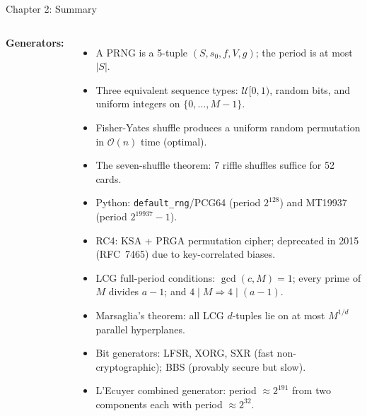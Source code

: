 \documentclass[aspectratio=169,10pt]{beamer}
\begin{document}
\begin{frame}{Chapter 2: Summary}

\begin{columns}
\textbf{Generators:}
\begin{itemize}
  \item A PRNG is a 5-tuple $(S, s_0, f, V, g)$; the period is at most $|S|$.
  \item Three equivalent sequence types: $\mathcal{U}[0,1)$, random bits,
    and uniform integers on $\{0,\ldots,M-1\}$.
  \item Fisher-Yates shuffle produces a uniform random permutation in
    $\mathcal{O}(n)$ time (optimal).
  \item The seven-shuffle theorem: 7 riffle shuffles suffice for 52 cards.
  \item Python: \texttt{default\_rng}/PCG64 (period $2^{128}$) and MT19937
    (period $2^{19937}-1$).
  \item RC4: KSA + PRGA permutation cipher; deprecated in 2015 (RFC~7465)
    due to key-correlated biases.
  \item LCG full-period conditions: $\gcd(c,M)=1$; every prime of $M$
    divides $a-1$; and $4 \mid M \Rightarrow 4 \mid (a-1)$.
  \item Marsaglia's theorem: all LCG $d$-tuples lie on at most $M^{1/d}$
    parallel hyperplanes.
  \item Bit generators: LFSR, XORG, SXR (fast non-cryptographic);
    BBS (provably secure but slow).
  \item L'Ecuyer combined generator: period $\approx 2^{191}$ from two
    components each with period $\approx 2^{32}$.
\end{itemize}


\end{columns}
\end{frame}
\end{document}
